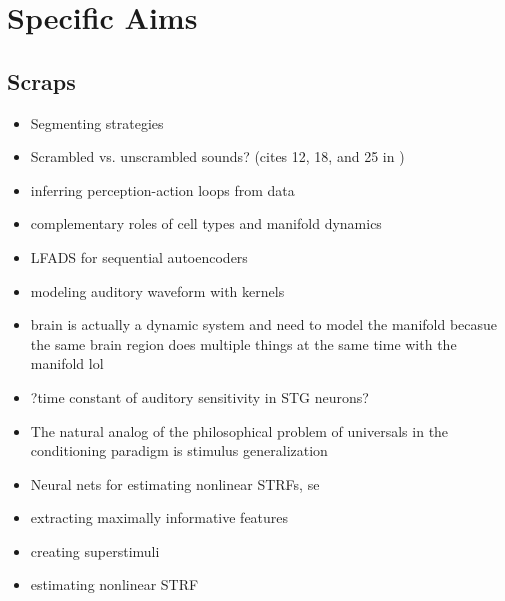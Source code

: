 
% 

\section{Specific Aims}

\begin{multicols}{2}

\subsection{Scraps}


\begin{itemize}
\item Segmenting strategies \cite{ashwoodMiceAlternateDiscrete2020}
\item Scrambled vs. unscrambled sounds? (cites 12, 18, and 25 in \cite{norman-haignereHierarchicalIntegrationMultiple2020})
\item inferring perception-action loops from data \cite{rosasCausalBlanketsTheory2020}
\item complementary roles of cell types and manifold dynamics \cite{dubreuilComplementaryRolesDimensionality2020}
\item LFADS for sequential autoencoders \cite{pandarinathInferringSingletrialNeural2018}
\item modeling auditory waveform with kernels \cite{smithEfficientAuditoryCoding2006a}
\item brain is actually a dynamic system and need to model the manifold \cite{brembsBrainDynamicallyActive2020} becasue the same brain region does multiple things at the same time with the manifold lol \cite{gallegoCorticalPopulationActivity2018}
\item ?time constant of auditory sensitivity in STG neurons?
\item The natural analog of the philosophical problem of universals in the conditioning paradigm is stimulus generalization \cite{roschWittgensteinCategorizationResearch1987}	
\item Neural nets for estimating nonlinear STRFs, se \cite{kingRecentAdvancesUnderstanding2018a}
\item extracting maximally informative features \cite{liuOptimalFeaturesAuditory2019}
\item creating superstimuli \cite{decharmsOptimizingSoundFeatures1998}
\item estimating nonlinear STRF\cite{ahrensNonlinearitiesContextualInfluences2008}
\end{itemize}


\end{multicols}
